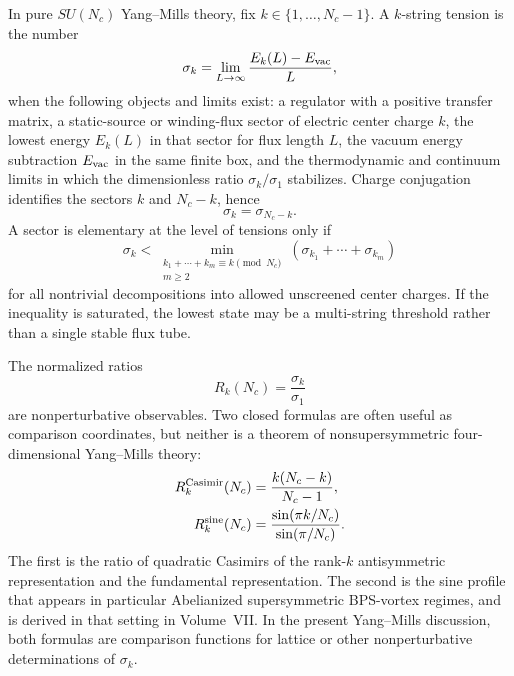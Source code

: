 \begin{definition}
\label{def:qcd-center-sector-string-tension}
In pure \(SU(N_c)\) Yang--Mills theory, fix
\(k\in\{1,\ldots,N_c-1\}\).  A \(k\)-string tension is the number
\begin{equation}
  \sigma_k
  =
  \lim_{L\to\infty}
  \frac{E_k(L)-E_{\rm vac}}{L},
  \label{eq:qcd-k-string-transfer-definition}
\end{equation}
when the following objects and limits exist: a regulator with a positive
transfer matrix, a static-source or winding-flux sector of electric center
charge \(k\), the lowest energy \(E_k(L)\) in that sector for flux length
\(L\), the vacuum energy subtraction \(E_{\rm vac}\) in the same finite box,
and the thermodynamic and continuum limits in which the dimensionless ratio
\(\sigma_k/\sigma_1\) stabilizes.  Charge conjugation identifies the sectors
\(k\) and \(N_c-k\), hence
\begin{equation}
  \sigma_k=\sigma_{N_c-k}.
  \label{eq:qcd-k-string-charge-conjugation}
\end{equation}
A sector is elementary at the level of tensions only if
\begin{equation}
  \sigma_k
  <
  \min_{\substack{k_1+\cdots+k_m\equiv k \!\!\!\pmod{N_c}\\ m\ge2}}
  (\sigma_{k_1}+\cdots+\sigma_{k_m})
  \label{eq:qcd-k-string-stability-criterion}
\end{equation}
for all nontrivial decompositions into allowed unscreened center charges.  If
the inequality is saturated, the lowest state may be a multi-string threshold
rather than a single stable flux tube.
\end{definition}

The normalized ratios
\[
  R_k(N_c)=\frac{\sigma_k}{\sigma_1}
\]
are nonperturbative observables.  Two closed formulas are often useful as
comparison coordinates, but neither is a theorem of nonsupersymmetric
four-dimensional Yang--Mills theory:
\begin{align}
  R_k^{\rm Casimir}(N_c)
  &=
  \frac{k(N_c-k)}{N_c-1},
  \label{eq:qcd-k-string-casimir-ratio}\\
  R_k^{\rm sine}(N_c)
  &=
  \frac{\sin(\pi k/N_c)}{\sin(\pi/N_c)}.
  \label{eq:qcd-k-string-sine-ratio}
\end{align}
The first is the ratio of quadratic Casimirs of the rank-\(k\) antisymmetric
representation and the fundamental representation.  The second is the sine
profile that appears in particular Abelianized supersymmetric BPS-vortex
regimes, and is derived in that setting in Volume~VII.  In the present
Yang--Mills discussion, both formulas are comparison functions for lattice or
other nonperturbative determinations of \(\sigma_k\).

